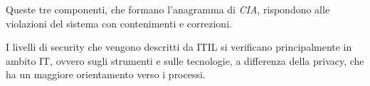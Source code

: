 		Queste tre componenti, che formano l'anagramma di \textit{CIA}, rispondono alle violazioni  del sistema con contenimenti e correzioni.
		
		I livelli di security che vengono descritti da ITIL si verificano principalmente in ambito IT, ovvero sugli strumenti e sulle tecnologie, a differenza della privacy, che ha un maggiore orientamento verso i processi.